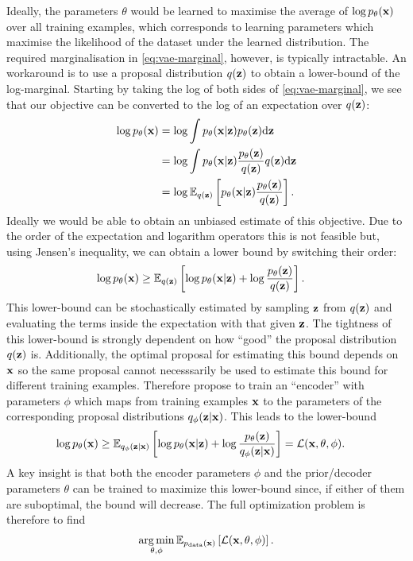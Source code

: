 Ideally, the parameters $\theta$ would be learned to
maximise the average of $\log p_\theta({\mathbf{x}})$ over all training examples, which corresponds to learning parameters which maximise the likelihood of the dataset under the learned distribution. The required marginalisation in \cref{eq:vae-marginal}, however, is typically intractable. An workaround is to use a proposal distribution $q({\mathbf{z}})$ to obtain a lower-bound of the log-marginal. Starting by taking the log of both sides of \cref{eq:vae-marginal}, we see that our objective can be converted to the log of an expectation over $q({\mathbf{z}})$:
\begin{align}
\log p_\theta({\mathbf{x}}) &= \log \int p_\theta({\mathbf{x}}|{\mathbf{z}})p_\theta({\mathbf{z}}) \mathrm{d}{\mathbf{z}} \\
    &= \log \int p_\theta({\mathbf{x}}|{\mathbf{z}}) \frac{p_\theta({\mathbf{z}})}{q({\mathbf{z}})} q({\mathbf{z}}) \mathrm{d}{\mathbf{z}} \\
    &= \log \mathbb{E}_{q({\mathbf{z}})} \left[ p_\theta({\mathbf{x}}|{\mathbf{z}}) \frac{p_\theta({\mathbf{z}})}{q({\mathbf{z}})} \right]. \label{eq:vae-marginal-is}
\end{align}
Ideally we would be able to obtain an unbiased estimate of this objective. Due to the order of the expectation and logarithm operators this is not feasible but, using Jensen's inequality, we can obtain a lower bound by switching their order: 
\begin{align}
    \log p_\theta({\mathbf{x}}) &\geq \mathbb{E}_{q({\mathbf{z}})} \left[ \log p_\theta({\mathbf{x}}|{\mathbf{z}}) + \log \frac{p_\theta({\mathbf{z}})}{q({\mathbf{z}})} \right].
\label{eq:marginal-is}
\end{align}
This lower-bound can be stochastically estimated by sampling ${\mathbf{z}}$ from $q({\mathbf{z}})$ and evaluating the terms inside the expectation with that given ${\mathbf{z}}$. The tightness of this lower-bound is strongly dependent on how ``good'' the proposal distribution $q({\mathbf{z}})$ is. Additionally, the optimal proposal for estimating this bound depends on ${\mathbf{x}}$ so the same proposal cannot necesssarily be used to estimate this bound for different training examples. Therefore \citet{kingma2013auto} propose to train an ``encoder'' with parameters $\phi$ which maps from training examples ${\mathbf{x}}$ to the parameters of the corresponding proposal distributions $q_\phi({\mathbf{z}}|{\mathbf{x}})$. This leads to the lower-bound
\begin{align}
    \log p_\theta({\mathbf{x}}) &\geq \mathbb{E}_{q_\phi({\mathbf{z}}|{\mathbf{x}})} \left[ \log p_\theta({\mathbf{x}}|{\mathbf{z}}) + \log \frac{p_\theta({\mathbf{z}})}{q_\phi({\mathbf{z}}|{\mathbf{x}})} \right] = {\mathcal{L}}({\mathbf{x}}, \theta, \phi).
\end{align}
A key insight is that both the encoder parameters $\phi$ and the prior/decoder parameters $\theta$ can be trained to maximize this lower-bound since, if either of them are suboptimal, the bound will decrease. The full optimization problem is therefore to find
\begin{align}
    \operatorname*{arg\,min}_{\theta,\phi} \mathbb{E}_{p_{\rm{data}}({\mathbf{x}})} \left[ {\mathcal{L}}({\mathbf{x}}, \theta, \phi) \right].
\end{align}

